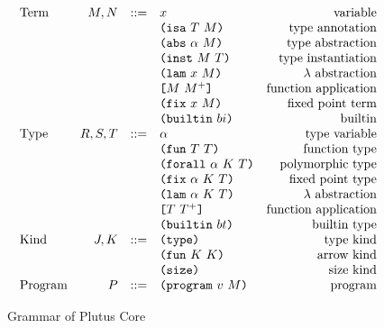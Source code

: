 \documentclass[../main.tex]{subfiles}
\begin{document}
\begin{figure*}[t]
    \centering
    \[\begin{array}{lrclr}
        \textrm{Term}             & M, N  & ::= & x                          & \textrm{variable}\\
                                  &       &     & \ann{M}{T}                 & \textrm{type annotation}\\
                                  &       &     & \abs{\alpha}{M}            & \textrm{type abstraction}\\
                                  &       &     & \inst{M}{T}                & \textrm{type instantiation}\\
                                  &       &     & \lam{x}{M}                 & \textrm{$\lambda$ abstraction}\\
                                  &       &     & \app{M}{M^+}               & \textrm{function application}\\
                                  &       &     & \fix{x}{M}                 & \textrm{fixed point term}\\
                                  &       &     & \builtin{bi}               & \textrm{builtin}\\
        \textrm{Type}             & R,S,T & ::= & \alpha                     & \textrm{type variable}\\
                                  &       &     & \funT{T}{T}                & \textrm{function type}\\
                                  &       &     & \forallT{\alpha}{K}{T}     & \textrm{polymorphic type}\\
                                  &       &     & \fixT{\alpha}{K}{T}        & \textrm{fixed point type}\\
                                  &       &     & \lamT{\alpha}{K}{T}        & \textrm{$\lambda$ abstraction}\\
                                  &       &     & \appT{T}{T^+}              & \textrm{function application}\\
                                  &       &     & \builtinT{bt}              & \textrm{builtin type}\\
        \textrm{Kind}             & J,K   & ::= & \typeK{}                   & \textrm{type kind}\\
                                  &       &     & \funK{K}{K}                & \textrm{arrow kind}\\
                                  &       &     & \sizeK{}                   & \textrm{size kind}\\
        \textrm{Program}          & P     & ::= & \program{v}{M}             & \textrm{program}\\

    \end{array}\]
    \caption{Grammar of Plutus Core}
    \label{fig:Plutus_core_grammar}
\end{figure*}
\end{document}
